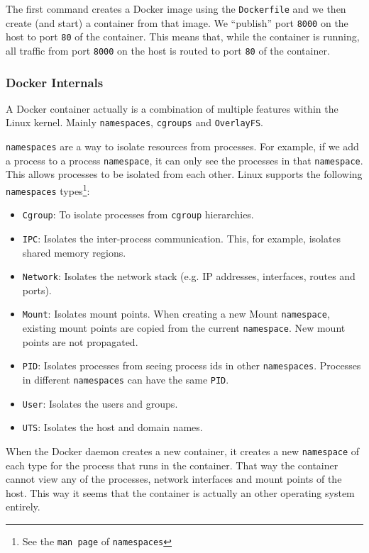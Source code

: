 The first command creates a Docker image using the \lstinline{Dockerfile} and we then create (and start) a container from that image. We ``publish'' port \lstinline{8000} on the host to port \lstinline{80} of the container. This means that, while the container is running, all traffic from port \lstinline{8000} on the host is routed to port \lstinline{80} of the container.

\subsubsection{Docker Internals}
A Docker container actually is a combination of multiple features within the Linux kernel.
Mainly \lstinline{namespaces}, \lstinline{cgroups} and \lstinline{OverlayFS}.

\hfill

\lstinline{namespaces} are a way to isolate resources from processes. For example, if we add a process to a process \lstinline{namespace}, it can only see the processes in that \lstinline{namespace}. This allows processes to be isolated from each other. Linux supports the following \lstinline{namespaces} types\footnote{See the \lstinline{man page} of \lstinline{namespaces}}:
\begin{itemize}
    \item \lstinline{Cgroup}: To isolate processes from \lstinline{cgroup} hierarchies.
    \item \lstinline{IPC}: Isolates the inter-process communication. This, for example, isolates shared memory regions.
    \item \lstinline{Network}: Isolates the network stack (e.g. IP addresses, interfaces, routes and ports).
    \item \lstinline{Mount}: Isolates mount points. When creating a new Mount \lstinline{namespace}, existing mount points are copied from the current \lstinline{namespace}. New mount points are not propagated.
    \item \lstinline{PID}: Isolates processes from seeing process ids in other \lstinline{namespaces}. Processes in different \lstinline{namespaces} can have the same \lstinline{PID}.
    \item \lstinline{User}: Isolates the users and groups.
    \item \lstinline{UTS}: Isolates the host and domain names.
\end{itemize}

When the Docker daemon creates a new container, it creates a new \lstinline{namespace} of each type for the process that runs in the container. That way the container cannot view any of the processes, network interfaces and mount points of the host. This way it seems that the container is actually an other operating system entirely.


